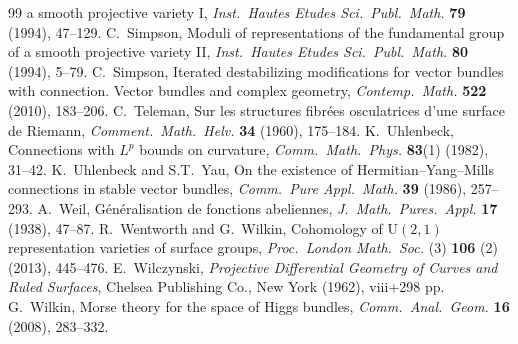 \begin{thebibliography}{99}
a smooth projective variety I, \emph{Inst.\ Hautes Etudes Sci.\ Publ.\ Math.} \textbf{79}
(1994), 47--129.
 C.~Simpson, Moduli of representations of the fundamental group of
a smooth projective variety II, \emph{Inst.\ Hautes Etudes Sci.\ Publ.\ Math.} \textbf{80}
(1994), 5--79.
 C.~Simpson, Iterated destabilizing modifications for vector bundles
with connection. Vector bundles and complex geometry, \emph{Contemp.\ Math.}
\textbf{522} (2010), 183--206.
 C.~Teleman, Sur les structures fibr\'{e}es osculatrices d'une
surface de Riemann, \emph{Comment.\ Math.\ Helv.} \textbf{34} (1960), 175--184.
 K.~Uhlenbeck, Connections with $L^p$ bounds on curvature,
\emph{Comm.\ Math.\ Phys.} \textbf{83}(1) (1982), 31--42.
 K.~Uhlenbeck and S.T.~Yau, On the existence of
Hermitian--Yang--Mills connections in stable vector bundles, \emph{Comm.\ Pure Appl.\
Math.} \textbf{39} (1986), 257--293.
 A.~Weil, G\'{e}n\'{e}ralisation de fonctions abeliennes,
\emph{J.\ Math.\ Pures.\ Appl.} \textbf{17} (1938), 47--87.
 R.~Wentworth and G.~Wilkin, Cohomology of $\mathrm{U}(2,1)$
representation varieties of surface groups, \emph{Proc.\ London Math.\ Soc.} (3)
\textbf{106} (2) (2013), 445--476.
 E.~Wilczynski, \emph{Projective Differential Geometry of Curves
and Ruled Surfaces}, Chelsea Publishing Co., New York (1962), viii+298 pp.
\bibitem{w-wilkin08} G.~Wilkin, Morse theory for the space of Higgs bundles,
\emph{Comm.\ Anal.\ Geom.} \textbf{16} (2008), 283--332.
\end{thebibliography}
